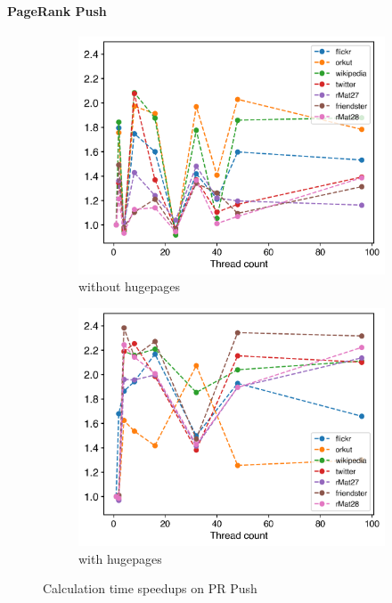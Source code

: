 \paragraph{PageRank Push}
\begin{figure}
	\hfil
	\begin{subfigure}{0.48\columnwidth}
		\includegraphics[width=\linewidth]{../../plots/singleNodePRPushGaloisThreads.png}
		\caption{without hugepages}
		\label{fig:galoisSpeedupPRPush_noHP}
	\end{subfigure}
	\begin{subfigure}{0.48\columnwidth}
		\includegraphics[width=\linewidth]{../../plots/singleNodePRPushGaloisHPThreads.png}
		\caption{with hugepages}
		\label{fig:galoisSpeedupPRPush_HP}
	\end{subfigure}
	\hfil
	\caption{Calculation time speedups on PR Push}
	\label{fig:galoisSpeedupPRPush}
\end{figure}

